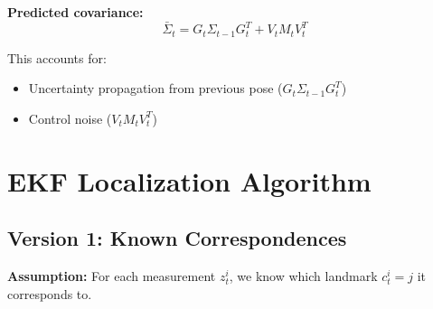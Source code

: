\textbf{Predicted covariance:}
\begin{equation}
\boxed{\bar{\Sigma}_t = G_t \Sigma_{t-1} G_t^T + V_t M_t V_t^T}
\end{equation}

This accounts for:
\begin{itemize}
    \item Uncertainty propagation from previous pose ($G_t \Sigma_{t-1} G_t^T$)
    \item Control noise ($V_t M_t V_t^T$)
\end{itemize}

\section{EKF Localization Algorithm}

\subsection{Version 1: Known Correspondences}

\textbf{Assumption:} For each measurement $z_t^i$, we know which landmark $c_t^i = j$ it corresponds to.


